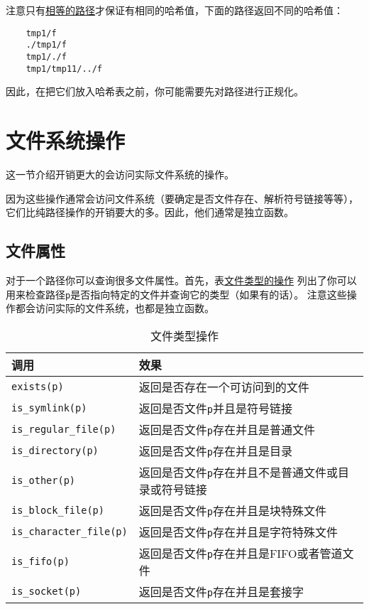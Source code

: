 注意只有\hyperref[ch20.3.6]{相等的路径}才保证有相同的哈希值，下面的路径返回不同的哈希值：
\begin{lstlisting}
    tmp1/f
    ./tmp1/f
    tmp1/./f
    tmp1/tmp11/../f
\end{lstlisting}
因此，在把它们放入哈希表之前，你可能需要先对路径进行正规化。


\section{文件系统操作}
这一节介绍开销更大的会访问实际文件系统的操作。

因为这些操作通常会访问文件系统（要确定是否文件存在、解析符号链接等等），
它们比纯路径操作的开销要大的多。因此，他们通常是独立函数。

\subsection{文件属性}\label{ch20.4.1}
对于一个路径你可以查询很多文件属性。首先，表\hyperref[t20.10]{文件类型的操作}
列出了你可以用来检查路径\texttt{p}是否指向特定的文件并查询它的类型（如果有的话）。
注意这些操作都会访问实际的文件系统，也都是独立函数。
\begin{table}[ht]
    \centering
    \begin{tabular}{l|l}
        \hline
        \textbf{调用}                     & \textbf{效果}                        \\
        \hline
        \texttt{exists(p)}              & 返回是否存在一个可访问到的文件                    \\
        \texttt{is\_symlink(p)}         & 返回是否文件\texttt{p}并且是符号链接            \\
        \texttt{is\_regular\_file(p)}   & 返回是否文件\texttt{p}存在并且是普通文件          \\
        \texttt{is\_directory(p)}       & 返回是否文件\texttt{p}存在并且是目录            \\
        \texttt{is\_other(p)}           & 返回是否文件\texttt{p}存在并且不是普通文件或目录或符号链接 \\
        \texttt{is\_block\_file(p)}     & 返回是否文件\texttt{p}存在并且是块特殊文件         \\
        \texttt{is\_character\_file(p)} & 返回是否文件\texttt{p}存在并且是字符特殊文件        \\
        \texttt{is\_fifo(p)}            & 返回是否文件\texttt{p}存在并且是FIFO或者管道文件    \\
        \texttt{is\_socket(p)}          & 返回是否文件\texttt{p}存在并且是套接字           \\
        \hline
    \end{tabular}
    \caption{文件类型操作}
    \label{t20.10}
\end{table}

